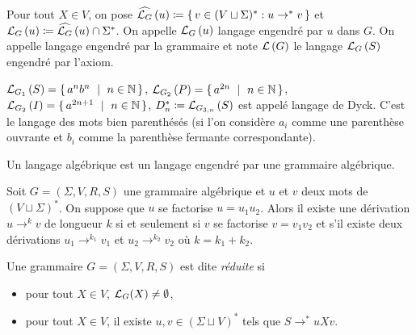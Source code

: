 \documentclass[../../agregation.tex]{subfiles}
\begin{document}
\begin{defn}
	Pour tout $X\in V$, on pose $\widehat{\mathcal{L}_{G}}\left(u\right)\coloneqq \set{v\in (V\sqcup\Sigma)^*:u\to^* v}$ et $\mathcal{L}_{G}\left(u\right)\coloneqq \widehat{\mathcal{L}_{G}}\left(u\right)\cap \Sigma^*$. On appelle $\mathcal{L}_{G}\left(u\right)$ langage engendré par $u$ dans $G$. On appelle langage engendré par la grammaire et note $\mathcal{L}\left(G\right)$ le langage $\mathcal{L}_{G}\left(S\right)$ engendré par l'axiom.
\end{defn}

\begin{example}
	$\L_{G_{1}}\left(S\right)=\set{a^{n}b^{n}\ |\ n\in\N}$, $\L_{G_{2}}\left(P\right)=\set{a^{2n}\ |\ n\in\N}$,
	$\L_{G_{2}}\left(I\right)=\set{a^{2n+1}\ |\ n\in\N}$, $D_{n}^{*}\coloneqq\mathcal{L}_{G_{3,n}}\left(S\right)$
	est appelé langage de Dyck. C'est le langage des mots bien parenthésés
	(si l'on considère $a_{i}$ comme une parenthèse ouvrante et $b_{i}$
	comme la parenthèse fermante correspondante).
\end{example}

\begin{defn}
	Un langage algébrique est un langage engendré par une grammaire algébrique.
\end{defn}

\begin{lem}[Fondamental]
	Soit $G=(\Sigma,V,R,S)$ une grammaire algébrique et $u$ et $v$ deux mots de $(V\sqcup \Sigma)^*$. On suppose que $u$ se factorise $u=u_1u_2$. Alors il existe une dérivation $u\to^k v$ de longueur $k$ si et seulement si $v$ se factorise $v=v_1v_2$ et s'il existe deux dérivations $u_1\to^{k_1}v_1$ et $u_2\to^{k_2}v_2$ où $k=k_1+k_2$.
\end{lem}




\begin{defn}
	Une grammaire $G=(\Sigma,V,R,S)$ est dite \emph{réduite} si
	\begin{itemize}
		\item pour tout $X\in V$, $\mathcal{L}_G(X)\not=\emptyset$,
		\item pour tout $X\in V$, il existe $u,v\in(\Sigma\sqcup V)^*$ tels que $S\to^*uXv$.
	\end{itemize}
\end{defn}
\end{document}
